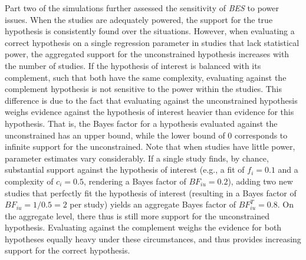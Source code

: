 \documentclass[
]{interact}
\begin{document}
Part two of the simulations further assessed the sensitivity of
\emph{BES} to power issues. When the studies are adequately powered, the
support for the true hypothesis is consistently found over the
situations. However, when evaluating a correct hypothesis on a single
regression parameter in studies that lack statistical power, the
aggregated support for the unconstrained hypothesis increases with the
number of studies. If the hypothesis of interest is balanced with its
complement, such that both have the same complexity, evaluating against
the complement hypothesis is not sensitive to the power within the
studies. This difference is due to the fact that evaluating against the
unconstrained hypothesis weighs evidence against the hypothesis of
interest heavier than evidence for this hypothesis. That is, the Bayes
factor for a hypothesis evaluated against the unconstrained has an upper
bound, while the lower bound of \(0\) corresponds to infinite support
for the unconstrained. Note that when studies have little power,
parameter estimates vary considerably. If a single study finds, by
chance, substantial support against the hypothesis of interest (e.g., a
fit of \(f_i=0.1\) and a complexity of \(c_i=0.5\), rendering a Bayes
factor of \(BF_{iu}=0.2\)), adding two new studies that perfectly fit
the hypothesis of interest (resulting in a Bayes factor of
\(BF_{iu}=1/0.5=2\) per study) yields an aggregate Bayes factor of
\(BF^T_{iu}=0.8\). On the aggregate level, there thus is still more
support for the unconstrained hypothesis. Evaluating against the
complement weighs the evidence for both hypotheses equally heavy under
these circumstances, and thus provides increasing support for the
correct hypothesis.
\end{document}

